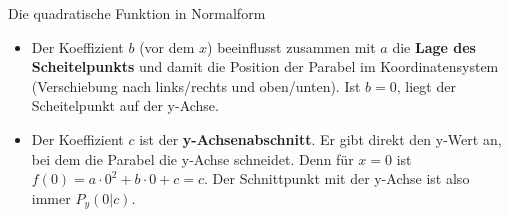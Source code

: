 \begin{merksatzumgebung}{Die quadratische Funktion in Normalform}
\begin{itemize}
\begin{itemize}
                \textit{Kurze Erinnerung zum Betrag einer Zahl:} Der Betrag einer Zahl $x$, geschrieben als $|x|$, ist ihr Abstand von der Null auf dem Zahlenstrahl. Der Betrag ist immer eine nicht-negative Zahl (also positiv oder Null).
                \begin{itemize}[nosep, leftmargin=2em] %
                    \item Ist eine Zahl $x$ \textbf{positiv oder Null}, ist ihr Betrag sie selbst: $|x|=x$. \\ Beispiele: $|7| = 7$; $|0| = 0$.
                    \item Ist eine Zahl $x$ \textbf{negativ}, ist ihr Betrag die positive Gegenzahl: $|x|=-x$. \\ Beispiel: $|-3| = -(-3) = 3$.
                \end{itemize}
                Der Betrag $|a|$ gibt uns also den Wert von $a$ ohne sein Vorzeichen an.

            \item Der nun erklärte \textbf{Betrag von $a$} (also $|a|$) bestimmt die \textbf{Form (Breite/Schmalheit)} der Parabel im Vergleich zur \textit{Normalparabel} $y=x^2$ (bei der $a=1$ ist):
                \begin{itemize}
                    \item $|a| > 1$: Die Parabel ist \textbf{gestreckter} (schmaler, steiler) als die Normalparabel.
                    \item $0 < |a| < 1$: Die Parabel ist \textbf{gestauchter} (breiter, flacher) als die Normalparabel.
                    \item $|a| = 1$: Die Parabel hat dieselbe Öffnungsweite wie die Normalparabel.
                \end{itemize}
        \end{itemize}
    \item Der Koeffizient $b$ (vor dem $x$) beeinflusst zusammen mit $a$ die \textbf{Lage des Scheitelpunkts} und damit die Position der Parabel im Koordinatensystem (Verschiebung nach links/rechts und oben/unten). Ist $b=0$, liegt der Scheitelpunkt auf der y-Achse.
    \item Der Koeffizient $c$ ist der \textbf{y-Achsenabschnitt}. Er gibt direkt den y-Wert an, bei dem die Parabel die y-Achse schneidet. Denn für $x=0$ ist $f(0) = a \cdot 0^2 + b \cdot 0 + c = c$. Der Schnittpunkt mit der y-Achse ist also immer $P_y(0|c)$.
\end{itemize}
\end{merksatzumgebung}

